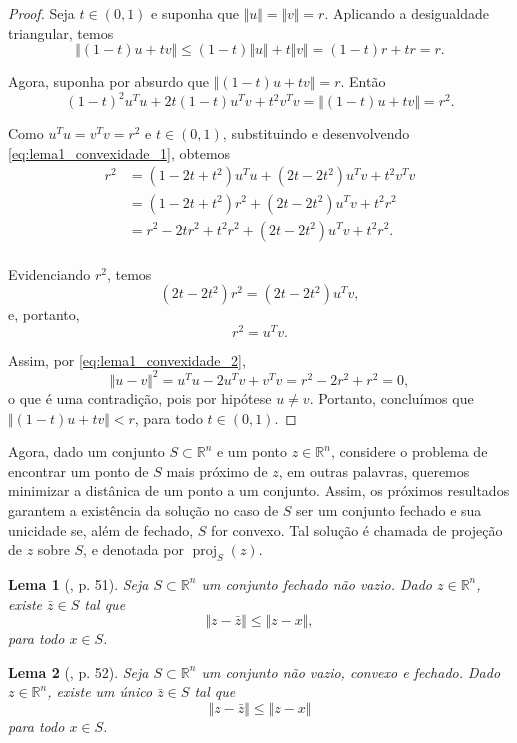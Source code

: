 \documentclass[12pt,a4paper]{scrartcl}
\DeclareMathOperator{\proj}{proj}
\def\RR{\mathds{R}}
\newtheorem{lema}{Lema}
\theoremstyle{definition}%
\begin{document}
\begin{proof}
Seja $t \in (0,1)$ e suponha que $\Vert u \Vert = \Vert v \Vert = r$. Aplicando a desigualdade triangular, temos
\[
\Vert (1-t)u + tv \Vert \leq (1-t)\Vert u \Vert + t\Vert v \Vert = (1-t)r + tr = r.
\]

Agora, suponha por absurdo que $\Vert (1-t)u + tv \Vert = r$. Então
\[ \label{eq:lema1_convexidade_1}
(1-t)^{2} u^{T}u + 2t(1-t)u^{T}v + t^{2}v^{T}v = \Vert (1-t)u + tv \Vert = r^{2}.
\]

Como $u^{T}u = v^{T}v = r^{2}$ e $t \in (0,1)$, substituindo e desenvolvendo \eqref{eq:lema1_convexidade_1}, obtemos 
\begin{align}
r^{2} &= (1-2t+t^{2}) u^{T}u + (2t-2t^{2})u^{T}v + t^{2}v^{T}v \\
&= (1-2t+t^{2}) r^{2} + (2t-2t^{2})u^{T}v + t^{2}r^{2} \\
&= r^{2} - 2tr^{2} + t^{2}r^{2} + (2t-2t^{2})u^{T}v + t^{2}r^{2} .\\
\end{align}

Evidenciando $r^{2}$, temos
\[ 
(2t-2t^{2})r^{2} = (2t-2t^{2})u^{T}v,
\]
e, portanto,
\[ \label{eq:lema1_convexidade_2}
r^{2} = u^{T}v.
\]

Assim, por \eqref{eq:lema1_convexidade_2},
\[
\Vert u-v \Vert^{2} = u^{T}u - 2u^{T}v + v^{T}v = r^{2} - 2r^{2} + r^{2} = 0,
\]
o que é uma contradição, pois por hipótese $u \neq v$. Portanto, concluímos que $\Vert (1-t)u + tv \Vert < r$, para todo $t \in (0,1)$.
\end{proof}

Agora, dado um conjunto $S \subset \RR^{n}$ e um ponto $z \in \RR^{n}$, considere o problema de encontrar um ponto de $S$ mais próximo de $z$, em outras palavras, queremos minimizar a distânica de um ponto a um conjunto. Assim, os próximos resultados garantem a existência da solução no caso de $S$ ser um conjunto fechado e sua unicidade se, além de fechado, $S$ for convexo. Tal solução é chamada de projeção de $z$ sobre $S$, e denotada por $\proj_{S} (z)$. 

\begin{lema} [\textcite{Ademir2013}, p. 51]
Seja $S \subset \RR^{n}$ um conjunto fechado não vazio. Dado $z \in \RR^{n}$, existe $\bar{z} \in S$ tal que
\[
\Vert z - \bar{z} \Vert \leq \Vert z - x \Vert,
\]
para todo $x \in S$.
\end{lema}

\begin{lema} [\textcite{Ademir2013}, p. 52] \label{lema_existenciaprojecao_convexidade}
Seja $S \subset \RR^{n}$ um conjunto não vazio, convexo e fechado. Dado $z \in \RR^{n}$, existe um único $\bar{z} \in S$ tal que
\[
\Vert z - \bar{z} \Vert \leq \Vert z - x \Vert
\]
para todo $x \in S$.
\end{lema}
\end{document}

